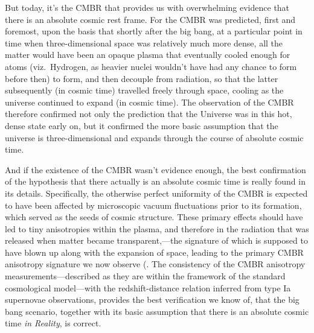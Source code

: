 \documentclass[12 pt]{article}
\begin{document}
But today, it's the CMBR that provides us with overwhelming evidence that there is an absolute cosmic rest frame. For the CMBR was predicted, first and foremost, upon the basis that shortly after the big bang, at a particular point in time when three-dimensional space was relatively much more dense, all the matter would have been an opaque plasma that eventually cooled enough for atoms (viz.\ Hydrogen, as heavier nuclei wouldn't have had any chance to form before then) to form, and then decouple from radiation, so that the latter subsequently (in cosmic time) travelled freely through space, cooling as the universe continued to expand (in cosmic time). The observation of the CMBR therefore confirmed not only the prediction that the Universe was in this hot, dense state early on, but it confirmed the more basic assumption that the universe is three-dimensional and expands through the course of absolute cosmic time.

And if the existence of the CMBR wasn't evidence enough, the best confirmation of the hypothesis that there actually is an absolute cosmic time is really found in its details. Specifically, the otherwise perfect uniformity of the CMBR is expected to have been affected by microscopic vacuum fluctuations prior to its formation, which served as the seeds of cosmic structure. These primary effects should have led to tiny anisotropies within the plasma, and therefore in the radiation that was released when matter became transparent,---the signature of which is supposed to have blown up along with the expansion of space, leading to the primary CMBR anisotropy signature we now observe (\citep{Peebles1970,Sunyaev1970,Zeldovich1972,Weinberg2008}. The consistency of the CMBR anisotropy measurements---described as they are within the framework of the standard cosmological model---with the redshift-distance relation inferred from type Ia supernovae observations, provides the best verification we know of, that the big bang scenario, together with its basic assumption that there is an absolute cosmic time \textit{in Reality}, is correct. 
\end{document}

